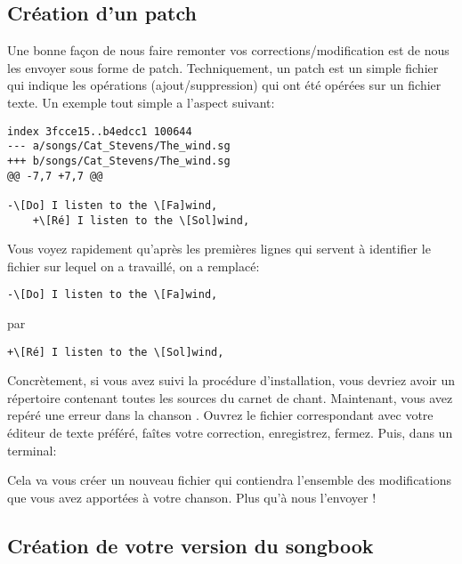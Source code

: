 \documentclass[versionenligne]{patacrep}
\begin{document}
\subsection{Création d'un patch}

Une bonne façon de nous faire remonter vos corrections/modification
est de nous les envoyer sous forme de patch. Techniquement, un patch
est un simple fichier qui indique les opérations (ajout/suppression)
qui ont été opérées sur un fichier texte. Un exemple tout simple a
l'aspect suivant:

\begin{verbatim}
index 3fcce15..b4edcc1 100644
--- a/songs/Cat_Stevens/The_wind.sg
+++ b/songs/Cat_Stevens/The_wind.sg
@@ -7,7 +7,7 @@

-\[Do] I listen to the \[Fa]wind,
    +\[Ré] I listen to the \[Sol]wind,
\end{verbatim}

Vous voyez rapidement qu'après les premières lignes qui servent à
identifier le fichier sur lequel on a travaillé, on a remplacé:
\begin{verbatim}
-\[Do] I listen to the \[Fa]wind,
\end{verbatim}
par
\begin{verbatim}
+\[Ré] I listen to the \[Sol]wind,
\end{verbatim}

Concrètement, si vous avez suivi la procédure d'installation, vous
devriez avoir un répertoire  contenant toutes
les sources du carnet de chant. Maintenant, vous avez repéré une
erreur dans la chanson . Ouvrez le
fichier correspondant avec votre éditeur de texte préféré, faîtes
votre correction, enregistrez, fermez. Puis, dans un terminal:


Cela va vous créer un nouveau fichier  qui contiendra
l'ensemble des modifications que vous avez apportées à votre
chanson. Plus qu'à nous l'envoyer !

\subsection{Création de votre version du songbook}
\end{document}
